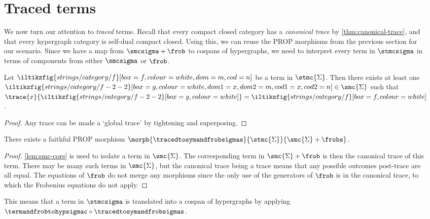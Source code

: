 \section{Traced terms}

We now turn our attention to \emph{traced} terms.
Recall that every compact closed category has a \emph{canonical trace} by
\cref{thm:canonical-trace}, and that every hypergraph category is self-dual
compact closed.
Using this, we can reuse the PROP morphisms from the previous section for our
scenario.
Since we have a map from \(\smcsigma + \frob\) to cospans of hypergraphs, we
need to interpret every term in \(\stmcsigma\) in terms of components from
either \(\smcsigma\) or \(\frob\).

\begin{lemma}\label{lem:smc-core}
    Let \(\iltikzfig{strings/category/f}[box=f,colour=white,dom=m,cod=n]\) be a
    term in \(\stmc{\Sigma}\).
    Then there exists at least one \(
        \iltikzfig{strings/category/f-2-2}[box=g,colour=white,dom1=x,dom2=m,cod1=x,cod2=n]
        \in \smc{\Sigma}
    \) such that \(
        \trace{x}{\iltikzfig{strings/category/f-2-2}[box=g, colour=white]}
        =
        \iltikzfig{strings/category/f}[box=f,colour=white]
    \).
\end{lemma}
\begin{proof}
    Any trace can be made a `global trace' by tightening and superposing.
\end{proof}

\begin{proposition}
    There exists a faithful PROP morphism \(
        \morph{\tracedtosymandfrobsigmas}{\stmc{\Sigma}}{\smc{\Sigma} + \frobs}
    \).
\end{proposition}
\begin{proof}
    \cref{lem:smc-core} is used to isolate a term in \(\smc{\Sigma}\).
    The corresponding term in \(\smc{\Sigma} + \frob\) is then the canonical
    trace of this term.
    There may be many such terms in \(\smc{\Sigma}\), but the canonical trace
    being a trace means that any possible outcomes post-trace are all equal.
    The equations of \(\frob\) do not merge any morphisms
    since the only use of the generators of \(\frob\) is in the canonical trace,
    to which the Frobenius equations do not apply.
\end{proof}

This means that a term in \(\stmcsigma\) is translated into a cospan of
hypergraphs by applying
\(\termandfrobtohypsigmac \circ \tracedtosymandfrobsigmas\).


